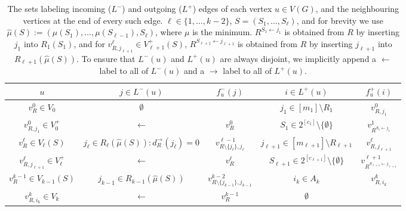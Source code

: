\documentclass{theoretics}
\renewcommand{\>}{\rangle}
\newcommand{\<}{\langle}
\renewcommand{\(}{\left(}
\renewcommand{\)}{\right)}
\begin{document}
\begin{table}
\renewcommand{\arraystretch}{1.3}
\begin{tabular}{|c|c|c|c|c|}
\hline
$u$ & $j\in L^-(u)$ & $f^-_u(j)$ & $i\in L^+(u)$ & $f^+_u(i)$\\
\hline
\hline
$v_R^0\in V_0$ & $\emptyset$ & & $j_1\in [m_1]\setminus R_1$ & $v_{R,j_1}^0$\\ 
\hline
$v_{R,j_1}^0\in V_0^+$ & $\leftarrow$ & $v_R^0$ & $S_1\in 2^{[c_1]}\setminus\{\emptyset\}$ & $v_{R^{S_1 \leftarrow j_1}}^1$\\
\hline
$v_{R}^{\ell}\in V_{\ell}(S)$ & $j_{\ell}\in R_{\ell}(\hat\mu(S)):d_R^{\rightarrow}(j_{\ell})=0$ & $v_{R\setminus\{j_{\ell}\},j_{\ell}}^{\ell-1}$ & $j_{\ell+1}\in [m_{\ell+1}]\setminus R_{\ell+1}$ & $v_{R,j_{\ell+1}}^{\ell}$\\ 
\hline
$v_{R,j_{\ell+1}}^{\ell}\in V_{\ell}^+$ & $\leftarrow$ & $v_{R}^{\ell}$ & $S_{\ell+1}\in 2^{[c_{\ell+1}]}\setminus\{\emptyset\}$ & $v_{R^{S_{\ell+1}\leftarrow j_{\ell+1}}}^{\ell+1}$\\
\hline
$v_{R}^{k-1}\in V_{k-1}(S)$ & $j_{k-1}\in R_{k-1}(\hat\mu(S))$ & $v_{R\setminus\{j_{k-1}\},j_{k-1}}^{k-2}$ & $i_k\in A_k$ & $v_{R,i_k}^k$\\
\hline
$v_{R,i_k}^k\in V_k$ & $\leftarrow$ & $v_R^{k-1}$ & $\emptyset$ & \\
\hline
\end{tabular}
\caption{The sets labeling incoming ($L^-$) and outgoing ($L^+$) edges of each vertex $u\in V(G)$, and the neighbouring vertices at the end of every such edge. $\ell\in\{1,\dots,k-2\}$, $S=(S_1,\dots,S_{\ell})$, and for brevity we use $\hat\mu(S):=(\mu(S_1),\dots,\mu(S_{\ell-1}),S_{\ell})$, where $\mu$ is the minimum. 
$R^{S_1\leftarrow j_1}$ is obtained from $R$ by inserting $j_1$ into $R_1(S_1)$, and for $v^{\ell}_{R,j_{\ell+1}}\in V_{\ell+1}^+(S)$, $R^{S_{\ell+1}\leftarrow j_{\ell+1}}$ is obtained from $R$ by inserting $j_{\ell+1}$ into $R_{\ell+1}(\hat\mu(S))$. To ensure that $L^-(u)$ and $L^+(u)$ are always disjoint, we implicitly append a $\leftarrow$ label to all of $L^-(u)$ and a $\rightarrow$ label to all of $L^+(u)$. }\label{tab:k-dist-index-sets}
\end{table}
\end{document}
